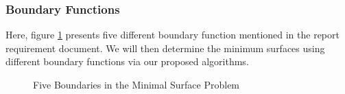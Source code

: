 \subsubsection{Boundary Functions}
Here, figure \ref{fig:boundary} presents five different boundary function mentioned in the report requirement document. We will then determine the minimum surfaces using different boundary functions via our proposed algorithms.
\begin{figure}[!htbp]
    \centering
    \caption{Five Boundaries in the Minimal Surface Problem}
    \label{fig:boundary}  
\end{figure}
